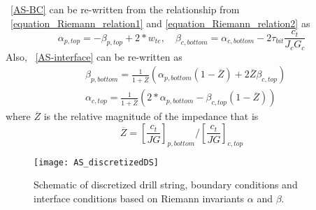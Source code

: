 \equationname~\ref{AS-BC} can be re-written from the relationship from \equationname~\ref{equation_Riemann_relation1} and \ref{equation_Riemann_relation2} as
\begin{equation}\label{AS-riemannBC}
  \alpha_{p,top} = -\beta_{p,top} + 2*w_{te}, \quad \beta_{c,bottom} = \alpha_{c,bottom} - 2\tau_{bit} \frac{c_t}{J_c G_c}
\end{equation}
Also, \equationname~\ref{AS-interface} can be re-written as
\begin{equation}\label{AS-riemanninterface}
\begin{split}
    & \beta_{p,bottom} = \frac{1}{1+\overline{Z}}\left(\alpha_{p,bottom}(1-\overline{Z}) + 2\overline{Z}\beta_{c,top} \right) \\
    & \alpha_{c,top} = \frac{1}{1+\overline{Z}}\left(2*\alpha_{p,bottom} - \beta_{c,top}(1-\overline{Z})\right)
\end{split}
\end{equation}
where $\overline{Z}$ is the relative magnitude of the impedance that is
\begin{equation}\label{AS_Zbar}
  \overline{Z} = \left[\frac{c_t}{JG}\right]_{p,bottom} / \left[\frac{c_t}{JG}\right]_{c,top}
\end{equation}
\begin{figure}[!hbt]
  \centering
  \texttt{[image: AS\_discretizedDS]}
  \caption[Schematic of discretized drill string and boundary conditions]{Schematic of discretized drill string, boundary conditions and interface conditions based on Riemann invariants $\alpha$ and $\beta$.}\label{AS_discretizeDS}
\end{figure}

